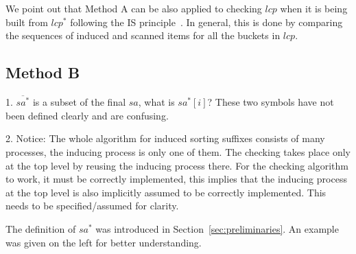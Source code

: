 \documentclass[10pt,journal,compsoc]{IEEEtran}
\begin{document}
We point out that Method A can be also applied to checking $lcp$ when it is being built from $lcp^*$ following the IS principle~\cite{Fischer11}. In general, this is done by comparing the sequences of induced and scanned items for all the buckets in $lcp$. 


\subsection{Method B}\label{sec:checkers:method_b}

{\color{red} 1. $\overline{sa^*}$ is a subset of the final $sa$, what is $sa^*[i]$? These two symbols have not been defined clearly and are confusing. 

2. Notice: The whole algorithm for induced sorting suffixes consists of many processes, the inducing process is only one of them. The checking takes place only at the top level by reusing the inducing process there. For the checking algorithm to work, it must be correctly implemented, this implies that the inducing process at the top level is also implicitly assumed to be correctly implemented. This needs to be specified/assumed for clarity.
}

{ \color{blue} The definition of $sa^*$ was introduced in Section~\ref{sec:preliminaries}. An example was given on the left for better understanding.}
\end{document}
